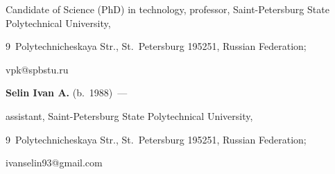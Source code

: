   Candidate  of Science  (PhD) in technology, professor,  Saint-Petersburg State Polytechnical University,


9~Polytechnicheskaya Str.,  St.\ Petersburg 195251, Russian Federation;


vpk@spbstu.ru





\vspace*{3pt}





\noindent


\textbf{Selin Ivan A.} (b.\ 1988)~---


 assistant, Saint-Petersburg State Polytechnical University,


9~Polytechnicheskaya Str.,  St.\ Petersburg 195251, Russian Federation;


ivanselin93@gmail.com





 \label{end\stat}








\renewcommand{\bibname}{\protect\rm Литература} 